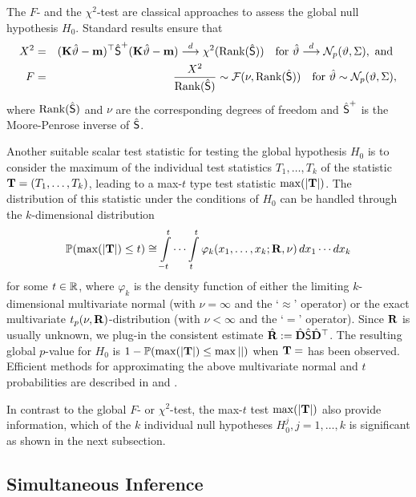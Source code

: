 \documentclass[12pt]{article}
\begin{document}
The $F$- and the $\chi^2$-test are classical approaches to assess the global
null hypothesis $H_0$. Standard results ensure that 
\begin{eqnarray*}
X^2 & = & (\K \hat{\vartheta} - \m)^\top \hat{\S }^+ (\K \hat{\vartheta} - \m%
) \cL \chi^2(\Rg(\hat{\S })) \quad \text{for } \hat{\vartheta} \cL \N%
_p(\vartheta, \Sigma), \text{ and } \\
F & = & \frac{X^2}{\Rg(\hat{\S })} \sim \F(\nu, \Rg(\hat{\S })) \quad \text{%
for } \hat{\vartheta} \sim \N_p(\vartheta, \Sigma),
\end{eqnarray*}
where $\Rg(\hat{\S })$ and $\nu$ are the corresponding degrees of freedom
and $\hat{\S }^+$ is the Moore-Penrose inverse of $\hat{\S }$.

Another suitable scalar test statistic for testing the global hypothesis $H_0
$ is to consider the maximum of the individual test statistics $T_1, \dots,
T_k$ of the statistic $\T = (T_1, \dots, T_k)$, leading to a max-$t$ type
test statistic $\max(|\T|)$. The distribution of this statistic under the
conditions of $H_0$ can be handled through the $k$-dimensional distribution 
\begin{eqnarray}  \label{maxt}
\Prob(\max(|\T|) \le t) \cong \int\limits_{-t}^t \cdots \int\limits_{t}^t
\varphi_k(x_1, \dots, x_k; \Cor, \nu) \, dx_1 \cdots dx_k
\end{eqnarray}
for some $t \in \R$, where $\varphi_k$ is the density function of either the
limiting $k$-dimensional multivariate normal (with $\nu = \infty$ and the `$%
\approx$' operator) or the exact multivariate $t_p(\nu, \Cor)$-distribution
(with $\nu < \infty$ and the `$=$' operator). Since $\Cor$ is usually
unknown, we plug-in the consistent estimate $\hat{\Cor} := \hat{\D} \hat{\S }
\hat{\D}^\top$. The resulting global $p$-value for $H_0$ is $1 - \Prob(\max(|%
\T|) \le \max|\mathtt{|)}$ when $\T = $ has been observed. Efficient methods
for approximating the above multivariate normal and $t$ probabilities are
described in \cite{Genz1992,GenzBretz1999,BretzGenzHothorn2001} and \cite%
{GenzBretz2002}. %

In contrast to the global $F$- or $\chi^2$-test, the max-$t$ test $\max(|\T|)
$ also provide information, which of the $k$ individual null hypotheses $%
H_0^j, j = 1, \dots, k$ is significant as shown in the next subsection.

\subsection{Simultaneous Inference}
\end{document}
